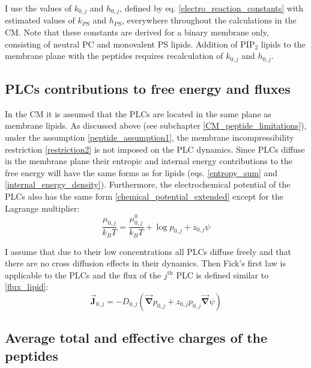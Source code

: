 I use the values of $k_{0,j}$ and $h_{0,j}$, defined by eq. \eqref{electro_reaction_constants} with estimated values of $k_{PS}$ and $h_{PS}$, everywhere throughout the calculations in the CM. Note that these constants are derived for a binary membrane only, consisting of neutral PC and monovalent PS lipids. Addition of PIP$_2$ lipids to the membrane plane with the peptides requires recalculation of $k_{0,j}$ and $h_{0,j}$.

\subsection{PLCs contributions to free energy and fluxes}

\label{peptide_free_energy_contribution}

In the CM it is assumed that the PLCs are located in the same plane as membrane lipids. As discussed above (see subchapter \ref{CM_peptide_limitations}), under the assumption \eqref{peptide_assumption1}, the membrane incompressibility restriction \eqref{restriction2} is not imposed on the PLC dynamics. Since PLCs diffuse in the membrane plane their entropic and internal energy contributions to the free energy will have the same forms as for lipids (eqs. \eqref{entropy_sum} and \eqref{internal_energy_density}). Furthermore, the electrochemical potential of the PLCs also has the same form \eqref{chemical_potential_extended} except for the Lagrange multiplier:
\begin{equation}
\label{elchempot_prot}\frac{\mu_{0,j}}{k_BT}= \frac{\mu_{0,j}^{0}}{k_BT} + \log p_{0,j} + z_{0,j}\psi
\end{equation}

I assume that due to their low concentrations all PLCs diffuse freely and that there are no cross diffusion effects in their dynamics. Then Fick's first law is applicable to the PLCs and the flux of the $j^\text{th}$ PLC is defined similar to \eqref{flux_lipid}:
\begin{equation}
 \label{flux_prot}\vec{\mathbf{J}}_{0,j}=-D_{0,j}(\vec{\mathbf{\nabla}} p_{0,j} + z_{0,j} p_{0,j} \vec{\mathbf{\nabla}}\psi)
\end{equation}

\subsection{Average total and effective charges of the peptides}

\label{total_effective_charge}

